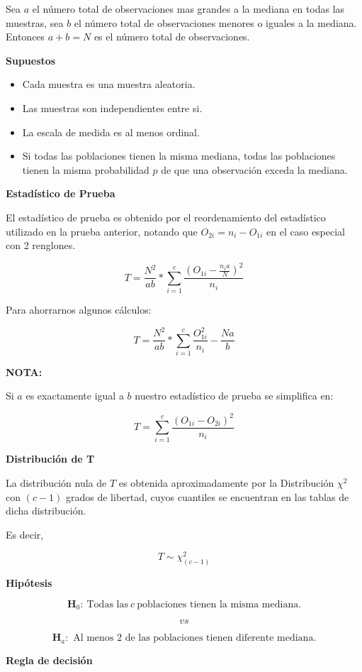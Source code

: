 \documentclass[
  a4paper,
  oneside,
  openany]{book}
\begin{document}
Sea \(a\) el número total de observaciones mas grandes a la mediana en todas las muestras, sea \(b\) el número total de observaciones menores o iguales a la mediana. Entonces \(a+b=N\) es el número total de observaciones.

\textbf{Supuestos}

\begin{itemize}
\item
  Cada muestra es una muestra aleatoria.
\item
  Las muestras son independientes entre si.
\item
  La escala de medida es al menos ordinal.
\item
  Si todas las poblaciones tienen la misma mediana, todas las poblaciones tienen la misma probabilidad \(p\) de que una observación exceda la mediana.
\end{itemize}

\textbf{Estadístico de Prueba}

El estadístico de prueba es obtenido por el reordenamiento del estadístico utilizado en la prueba anterior, notando que \(O_{2i}=n_{i}-O_{1i}\) en el caso especial con 2 renglones.

\[T=\frac{N^2}{ab}*\sum^{c}_{i=1}\frac{(O_{1i}-\frac{n_{i}a}{N})^2}{n_i}\]

Para ahorrarnos algunos cálculos:

\[T=\frac{N^2}{ab}*\sum^{c}_{i=1}\frac{O_{1i}^2}{n_i}-\frac{Na}{b}\]

\textbf{NOTA:}

Si \(a\) es exactamente igual a \(b\) nuestro estadístico de prueba se simplifica en:

\[T=\sum^{c}_{i=1}\frac{(O_{1i}-O_{2i})^2}{n_i}\]

\textbf{Distribución de T}

La distribución nula de \(T\) es obtenida aproximadamente por la Distribución \(\chi^2\) con \((c-1)\) grados de libertad, cuyos cuantiles se encuentran en las tablas de dicha distribución.

Es decir,

\[T\sim \chi^2_{(c-1)}\]

\textbf{Hipótesis}

\[\textbf{H}_0: \ \mbox{Todas las} \  c \  \mbox{poblaciones tienen la misma mediana.}\]

\[vs\]

\[\textbf{H}_a:\mbox{ Al menos 2 de las poblaciones tienen diferente mediana.}\]

\textbf{Regla de decisión}
\end{document}
